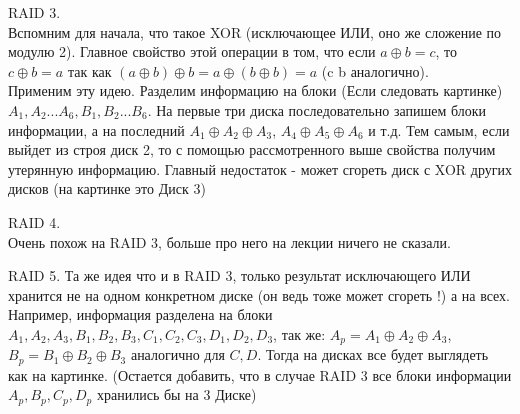 RAID 3. \\
Вспомним для начала, что такое XOR (исключающее ИЛИ, оно же сложение по модулю 2). Главное свойство этой операции в том, что если 
$a \oplus b = c$, то $c \oplus b = a$ так как $(a \oplus b) \oplus b = a \oplus (b \oplus b) = a$ (c b аналогично). \\
Применим эту идею. Разделим информацию на блоки (Если следовать картинке) $A_1, A_2 ... A_6, B_1, B_2 ... B_6$. На первые три диска последовательно запишем блоки информации, а на последний $A_1 \oplus A_2 \oplus A_3$, $A_4 \oplus A_5 \oplus A_6$ и т.д. Тем самым, если выйдет из строя диск 2, то с помощью рассмотренного выше свойства получим утерянную информацию. Главный недостаток - может сгореть диск с XOR других дисков (на картинке это Диск 3)

\begin{figure}[h!]
\begin{minipage}[h]{0.49\linewidth}
\end{minipage}
\hfill
\begin{minipage}[h]{0.49\linewidth}
\end{minipage}
\end{figure}


RAID 4. \\
Очень похож на RAID 3, больше про него на лекции ничего не сказали.

RAID 5.
Та же идея что и в RAID 3, только результат исключающего ИЛИ хранится не на одном конкретном диске (он ведь тоже может сгореть !) а на всех. Например, информация разделена на блоки $A_1, A_2, A_3, B_1, B_2, B_3, C_1, C_2, C_3, D_1, D_2, D_3$, так же:
$A_p = A_1 \oplus A_2 \oplus A_3$, 
$B_p = B_1 \oplus B_2 \oplus B_3$ аналогично для $C, D$. Тогда на дисках все будет выглядеть как на картинке. (Остается добавить, что в случае RAID 3 все блоки информации $A_p, B_p, C_p, D_p$ хранились бы на 3 Диске)

